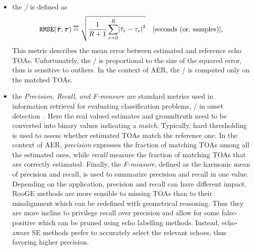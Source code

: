 \begin{itemize}
    \item the \textit{\RMSEtxt/} is defined as
    \begin{equation}
        \RMSE(\hat{\boldsymbol{\tau}}, \boldsymbol{\tau}) \eqdef \sqrt{\frac{1}{R+1} \sum_{\idxEch=0}^{\numEchs} \abs{\hat{\tau}_\idxEch - \tau_\idxEch}^2} \quad \text{[seconds (or, samples)]}
        ,
    \end{equation}
    This metric describes the mean error between estimated and reference echo \acp{TOA}.
    Unfortunately, the \RMSEtxt/ is proportional to the size of the squared error, thus is sensitive to outliers.
    In the context of \ac{AER}, the \RMSEtxt/ is computed only on the matched \acp{TOA}.
    \item the \textit{Precision, Recall, and F-measure} are standard metrics used in information retrieval for evaluating classification problems, \eg/ in onset detection~.
    Here the real valued estimates and groundtruth need to be converted into binary values indicating a \textit{match}. Typically, hard thresholding is used to assess whether estimated \acp{TOA} match the reference one.
    In the context of \ac{AER}, \textit{precision} expresses the fraction of matching \acp{TOA} among all the estimated ones, while \textit{recall} measure the fraction of matching \acp{TOA} that are correctly estimated.
    Finally, the \textit{F-measure}, defined as the harmonic mean of precision and recall, is used to summarize precision and recall in one value.
    \\Depending on the application, precision and recall can have different impact.
    \ac{RooGE} methods are more sensible to missing \acp{TOA} than to their misalignment which can be redefined with geometrical reasoning.
    Thus they are more incline to privilege recall over precision and allow for some false-positive which can be pruned using echo labelling methods.
    Instead, echo-aware \ac{SE} methods prefer to accurately select the relevant echoes, thus favoring higher precision.
\end{itemize}

